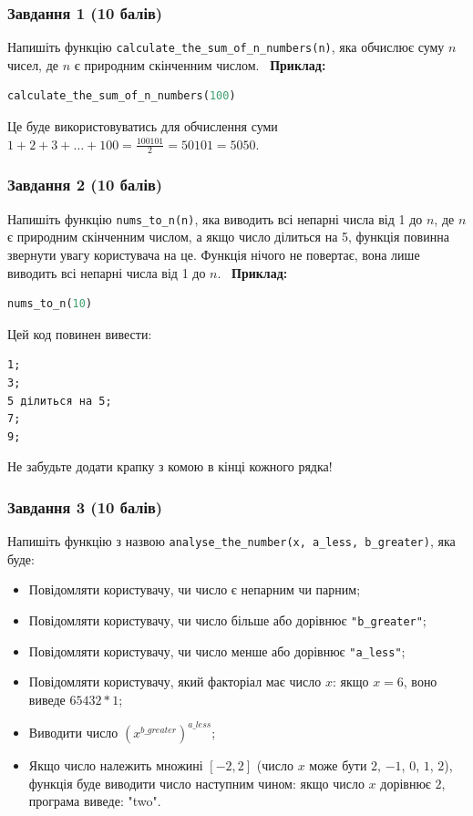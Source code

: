 \documentclass[12pt]{article}
\begin{document}
\subsubsection{Завдання 1 (10 балів)}
Напишіть функцію \texttt{calculate\_the\_sum\_of\_n\_numbers(n)}, яка обчислює суму $n$ чисел, де $n$ є природним скінченним числом. \
\textbf{Приклад:}
\begin{lstlisting}[language=Python]
calculate_the_sum_of_n_numbers(100)
\end{lstlisting}
Це буде використовуватись для обчислення суми $1 + 2 + 3 + \dots + 100 = \frac{100101}{2} = 50101 = 5050$.

\subsubsection{Завдання 2 (10 балів)}
Напишіть функцію \texttt{nums\_to\_n(n)}, яка виводить всі непарні числа від 1 до $n$, де $n$ є природним скінченним числом, а якщо число ділиться на 5, функція повинна звернути увагу користувача на це. Функція нічого не повертає, вона лише виводить всі непарні числа від 1 до $n$. \
\textbf{Приклад:}
\begin{lstlisting}[language=Python]
nums_to_n(10)
\end{lstlisting}
Цей код повинен вивести:
\begin{verbatim}
1;
3;
5 ділиться на 5;
7;
9;
\end{verbatim}
Не забудьте додати крапку з комою в кінці кожного рядка!

\subsubsection{Завдання 3 (10 балів)}
Напишіть функцію з назвою \texttt{analyse\_the\_number(x, a\_less, b\_greater)}, яка буде:
\begin{itemize}
\item Повідомляти користувачу, чи число є непарним чи парним;
\item Повідомляти користувачу, чи число більше або дорівнює \texttt{"b\_greater"};
\item Повідомляти користувачу, чи число менше або дорівнює \texttt{"a\_less"};
\item Повідомляти користувачу, який факторіал має число $x$: якщо $x = 6$, воно виведе $65432*1$;
\item Виводити число $(x^{b\_greater})^{a\_less}$;
\item Якщо число належить множині $[-2, 2]$ (число $x$ може бути $2$, $-1$, $0$, $1$, $2$), функція буде виводити число наступним чином: якщо число $x$ дорівнює $2$, програма виведе: "two".
\end{itemize}
\end{document}
